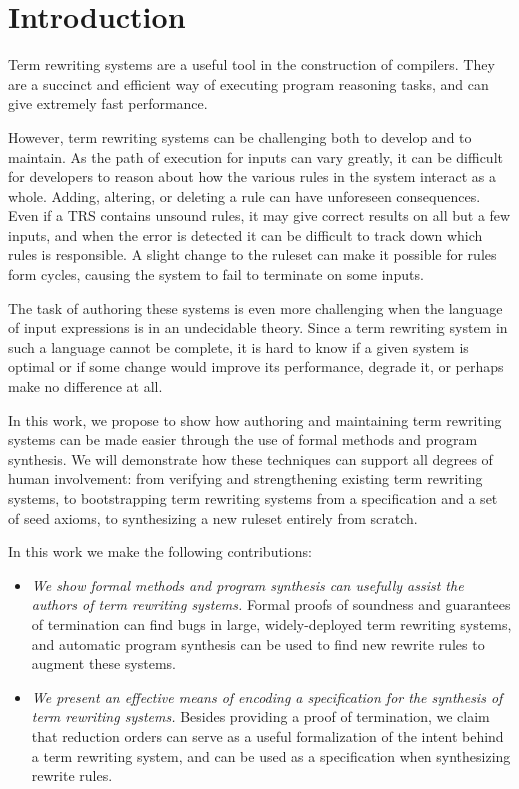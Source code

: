 \chapter{Introduction}
\label{sec:intro}

Term rewriting systems are a useful tool in the construction of compilers. They are a succinct and efficient way of executing program reasoning tasks, and can give extremely fast performance. 

However, term rewriting systems can be challenging both to develop and to maintain. As the path of execution for inputs can vary greatly, it can be difficult for developers to reason about how the various rules in the system interact as a whole. Adding, altering, or deleting a rule can have unforeseen consequences. Even if a TRS contains unsound rules, it may give correct results on all but a few inputs, and when the error is detected it can be difficult to track down which rules is responsible. A slight change to the ruleset can make it possible for rules form cycles, causing the system to fail to terminate on some inputs. 

The task of authoring these systems is even more challenging when the language of input expressions is in an undecidable theory. Since a term rewriting system in such a language cannot be complete, it is hard to know if a given system is optimal or if some change would improve its performance, degrade it, or perhaps make no difference at all.

In this work, we propose to show how authoring and maintaining term rewriting systems can be made easier through the use of formal methods and program synthesis. We will demonstrate how these techniques can support all degrees of human involvement: from verifying and strengthening existing term rewriting systems, to bootstrapping term rewriting systems from a specification and a set of seed axioms, to synthesizing a new ruleset entirely from scratch.

In this work we make the following contributions:

\begin{itemize}
    \item \emph{We show formal methods and program synthesis can usefully assist the authors of term rewriting systems.} Formal proofs of soundness and guarantees of termination can find bugs in large, widely-deployed term rewriting systems, and automatic program synthesis can be used to find new rewrite rules to augment these systems.
    \item \emph{We present an effective means of encoding a specification for the synthesis of term rewriting systems.} Besides providing a proof of termination, we claim that reduction orders can serve as a useful formalization of the intent behind a term rewriting system, and can be used as a specification when synthesizing rewrite rules.
\end{itemize}

